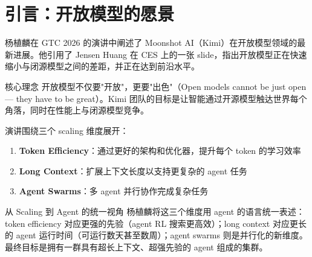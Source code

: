 \section{引言：开放模型的愿景}

杨植麟在 GTC 2026 的演讲中阐述了 Moonshot AI（Kimi）在开放模型领域的最新进展。他引用了 Jensen Huang 在 CES 上的一张 slide，指出开放模型正在快速缩小与闭源模型之间的差距，并正在达到前沿水平。

\begin{importantbox}{核心理念}
开放模型不仅要"开放"，更要"出色"（Open models cannot be just open --- they have to be great）。Kimi 团队的目标是让智能通过开源模型触达世界每个角落，同时在性能上与闭源模型竞争。
\end{importantbox}

演讲围绕三个 scaling 维度展开：
\begin{enumerate}
    \item \textbf{Token Efficiency}：通过更好的架构和优化器，提升每个 token 的学习效率
    \item \textbf{Long Context}：扩展上下文长度以支持更复杂的 agent 任务
    \item \textbf{Agent Swarms}：多 agent 并行协作完成复杂任务
\end{enumerate}

\begin{knowledgebox}{从 Scaling 到 Agent 的统一视角}
杨植麟将这三个维度用 agent 的语言统一表述：token efficiency 对应更强的先验（agent RL 搜索更高效）；long context 对应更长的 agent 运行时间（可运行数天甚至数周）；agent swarms 则是并行化的新维度。最终目标是拥有一群具有超长上下文、超强先验的 agent 组成的集群。
\end{knowledgebox}


